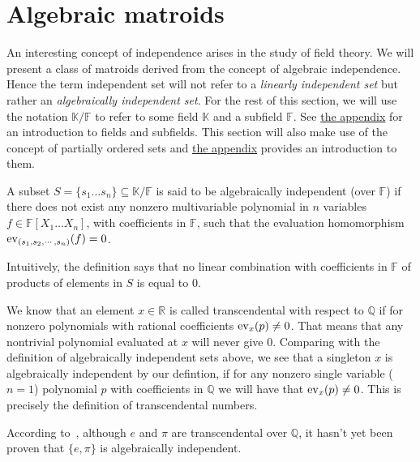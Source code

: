 \newpage

\section{Algebraic matroids}\label{sec:algebraic-matroids}

An interesting concept of independence arises in the study of field theory.  We will present a class of matroids derived from the concept of algebraic independence. Hence the term independent set will not refer to a \textit{linearly independent set} but rather an \textit{algebraically independent set}. For the rest of this section, we will use the notation $\mathbb K / \mathbb F$ to refer to some field $\mathbb K$ and a subfield $\mathbb F$. See \hyperref[sec:appendix-fields]{the appendix} for an introduction to fields and subfields. This section will also make use of the concept of partially ordered sets and  \hyperref[sec:appendix-poset]{the appendix} provides an introduction to them.

\begin{defn}
	A subset $S = \{ s_1 \ldots s _n \} \subseteq \mathbb K / \mathbb F$ is said to be algebraically independent (over $\mathbb F$) if there does not exist any
	nonzero multivariable polynomial in $n$ variables $f \in \mathbb{F}[X _1 \ldots X _n]$, with coefficients in $\mathbb{F} $, such that the evaluation homomorphism $\mathrm{ev}_{(s_1, s_2,\cdots,s_n)}(f) = 0$.
\end{defn}
Intuitively, the definition says that no linear combination with coefficients in $\mathbb F$ of products of elements in $S$ is equal to $0$.

We know that an element $x\in \mathbb{R}$ is called transcendental with respect to $\mathbb{Q}$ if for nonzero polynomials with rational coefficients $\mathrm{ev}_{x}(p) \neq 0$. That means that any nontrivial polynomial evaluated at $x$ will never give 0.
Comparing with the definition of algebraically independent sets above, we see that a singleton ${x}$ is algebraically independent by our defintion, if for any nonzero  single variable ($n = 1$) polynomial $p$ with coefficients in $\mathbb{Q}$ we will have that $\mathrm{ev}_{x}(p) \neq 0$. This is precisely the definition of transcendental numbers.

\begin{exmp}
According to~\cite[113]{milne2022}, although $e$ and $\pi$ are transcendental over $\mathbb{Q}$, it hasn't yet been proven that $\{e, \pi \}$ is algebraically independent.
\end{exmp}

